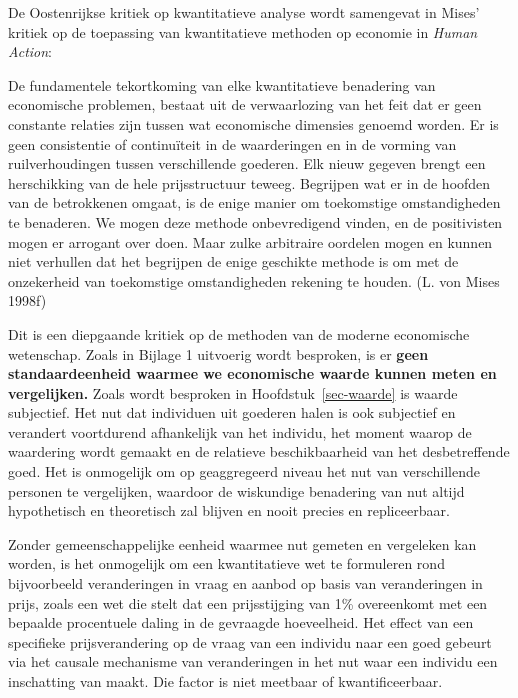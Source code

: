 \documentclass[
  a5paper,
  smalldemyvopaper,11pt,twoside,onecolumn,openright,extrafontsizes,
hidelinks]{memoir}
\begin{document}
De Oostenrijkse kritiek op kwantitatieve analyse wordt samengevat in
Mises' kritiek op de toepassing van kwantitatieve methoden op economie
in \emph{Human Action}:

De fundamentele tekortkoming van elke kwantitatieve benadering van
economische problemen, bestaat uit de verwaarlozing van het feit dat er
geen constante relaties zijn tussen wat economische dimensies genoemd
worden. Er is geen consistentie of continuïteit in de waarderingen en in
de vorming van ruilverhoudingen tussen verschillende goederen. Elk nieuw
gegeven brengt een herschikking van de hele prijsstructuur teweeg.
Begrijpen wat er in de hoofden van de betrokkenen omgaat, is de enige
manier om toekomstige omstandigheden te benaderen. We mogen deze methode
onbevredigend vinden, en de positivisten mogen er arrogant over doen.
Maar zulke arbitraire oordelen mogen en kunnen niet verhullen dat het
begrijpen de enige geschikte methode is om met de onzekerheid van
toekomstige omstandigheden rekening te houden. (L. von Mises 1998f)

Dit is een diepgaande kritiek op de methoden van de moderne economische
wetenschap. Zoals in Bijlage 1 uitvoerig wordt besproken, is er
\textbf{geen standaardeenheid waarmee we economische waarde kunnen meten
en vergelijken.} Zoals wordt besproken in Hoofdstuk~\ref{sec-waarde} is
waarde subjectief. Het nut dat individuen uit goederen halen is ook
subjectief en verandert voortdurend afhankelijk van het individu, het
moment waarop de waardering wordt gemaakt en de relatieve
beschikbaarheid van het desbetreffende goed. Het is onmogelijk om op
geaggregeerd niveau het nut van verschillende personen te vergelijken,
waardoor de wiskundige benadering van nut altijd hypothetisch en
theoretisch zal blijven en nooit precies en repliceerbaar.

Zonder gemeenschappelijke eenheid waarmee nut gemeten en vergeleken kan
worden, is het onmogelijk om een kwantitatieve wet te formuleren rond
bijvoorbeeld veranderingen in vraag en aanbod op basis van veranderingen
in prijs, zoals een wet die stelt dat een prijsstijging van 1\%
overeenkomt met een bepaalde procentuele daling in de gevraagde
hoeveelheid. Het effect van een specifieke prijsverandering op de vraag
van een individu naar een goed gebeurt via het causale mechanisme van
veranderingen in het nut waar een individu een inschatting van maakt.
Die factor is niet meetbaar of kwantificeerbaar.
\end{document}
